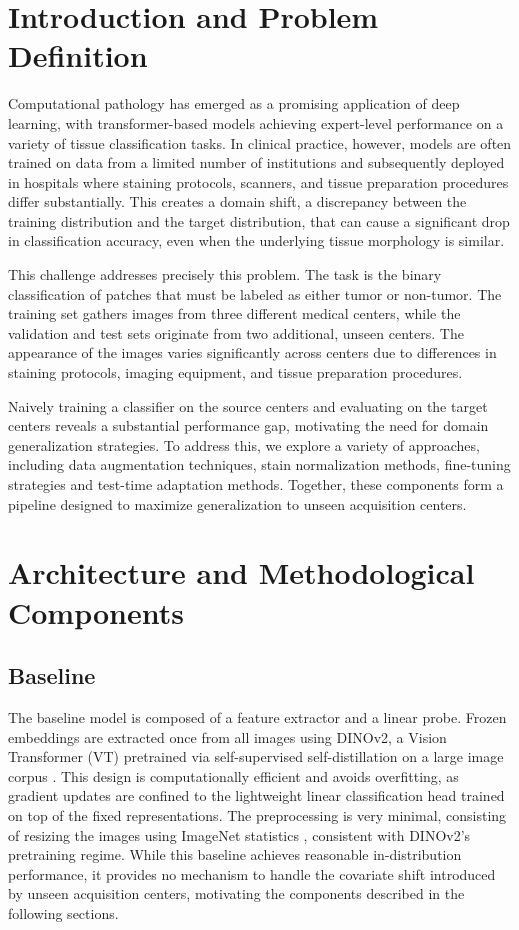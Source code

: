 \documentclass{midl}
\begin{document}
\section{Introduction and Problem Definition}

Computational pathology has emerged as a promising application of deep learning, with transformer-based models achieving expert-level performance on a variety of tissue classification tasks. In clinical practice, however, models are often trained on data from a limited number of institutions and subsequently deployed in hospitals where staining protocols, scanners, and tissue preparation procedures differ substantially. This creates a domain shift, a discrepancy between the training distribution and the target distribution, that can cause a significant drop in classification accuracy, even when the underlying tissue morphology is similar. 

This challenge addresses precisely this problem. The task is the binary classification of patches that must be labeled as either tumor or non-tumor. The training set gathers images from three different medical centers, while the validation and test sets originate from two additional, unseen centers. The appearance of the images varies significantly across centers due to differences in staining protocols, imaging equipment, and tissue preparation procedures. 

Naively training a classifier on the source centers and evaluating on the target centers reveals a substantial performance gap, motivating the need for domain generalization strategies. To address this, we explore a variety of approaches, including data augmentation techniques, stain normalization methods, fine-tuning strategies and test-time adaptation methods. Together, these components form a pipeline designed to maximize generalization to unseen acquisition centers.

\section{Architecture and Methodological Components}
\subsection{Baseline}

The baseline model is composed of a feature extractor and a linear probe. Frozen embeddings are extracted once from all images using DINOv2, a Vision Transformer (VT) pretrained via self-supervised self-distillation on a large image corpus \cite{oquab2023dinov2}. This design is computationally efficient and avoids overfitting, as gradient updates are confined to the lightweight linear classification head trained on top of the fixed representations. The preprocessing is very minimal, consisting of resizing the images using ImageNet statistics \cite{deng2009imagenet}, consistent with DINOv2's pretraining regime. While this baseline achieves reasonable in-distribution performance, it provides no mechanism to handle the covariate shift introduced by unseen acquisition centers, motivating the components described in the following sections.
\end{document}
